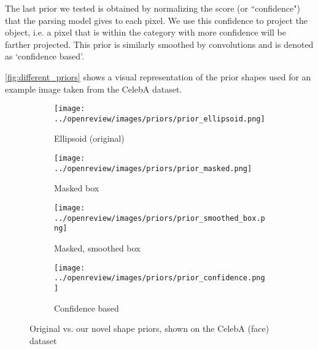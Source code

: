 The last prior we tested is obtained by normalizing the score (or ``confidence") that the parsing model gives to each pixel. We use this confidence to project the object, i.e. a pixel that is within the category with more confidence will be farther projected. This prior is similarly smoothed by convolutions and is denoted as `confidence based'. 

\autoref{fig:different_priors} shows a visual representation of the prior shapes used for an example image taken from the CelebA dataset.
\begin{figure}[!htb]
    \centering
    \begin{subfigure}[t]{0.20\textwidth}
        \texttt{[image: ../openreview/images/priors/prior\_ellipsoid.png]}
        \caption{Ellipsoid (original)}
    \end{subfigure}
    \begin{subfigure}[t]{0.20\textwidth}
        \texttt{[image: ../openreview/images/priors/prior\_masked.png]}
        \caption{Masked box}
    \end{subfigure}
    \begin{subfigure}[t]{0.20\textwidth}
        \texttt{[image: ../openreview/images/priors/prior\_smoothed\_box.png]}
        \caption{Masked, smoothed box}
        \label{subfig:c}
    \end{subfigure}
    \begin{subfigure}[t]{0.20\textwidth}
        \texttt{[image: ../openreview/images/priors/prior\_confidence.png]}
        \caption{Confidence based}
        \label{subfig:d}
    \end{subfigure}
    \caption{Original vs. our novel shape priors, shown on the CelebA (face) dataset}
    \label{fig:different_priors}
\end{figure}

